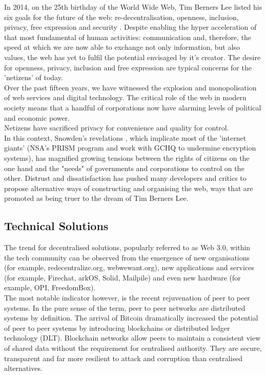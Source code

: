 In 2014, on the 25th birthday of the World Wide Web, Tim Berners Lee listed his six goals for the future of the web:  re-decentralisation, openness, inclusion, privacy, free expression and security \cite{berners_lee}.  Despite enabling the hyper acceleration of that most fundamental of human activities: communication and, therefore, the speed at which we are now able to exchange not only information, but also values, the web has yet to fulfil the potential envisaged by it's creator.  The desire for openness, privacy, inclusion and free expression are typical concerns for the 'netizens' of today. \\

Over the past fifteen years, we have witnessed the explosion and monopolisation of web services and digital technology. The critical role of the web in modern society means that a handful of corporations now have alarming levels of political and economic power. \\

Netizens have sacrificed privacy for convenience and quality for control.\\

In this context, Snowden's revelations \cite{Snowden}, which implicate most of the 'internet giants' \cite{nsa_giants} (NSA's PRISM \cite{Prism} program and work with GCHQ to undermine encryption systems\cite{nsa_undermine}), has magnified growing tensions between the rights of citizens on the one hand and the "needs" of governments and corporations to control on the other. Distrust and dissatisfaction has pushed many developers and critics to propose alternative ways of constructing and organising the web, ways that are promoted as being truer to the dream of Tim Berners Lee. 

\subsection{Technical Solutions}
The trend for decentralised solutions, popularly referred to as Web 3.0, within the tech community can be observed from the emergence of new organisations (for example, redecentralize.org\cite{Redecentralise}, webwewant.org\cite{Webwewant}), new applications and services (for example, Firechat\cite{Firechat}, arkOS\cite{Arkos}, Solid\cite{Solid}, Mailpile\cite{Mailpile}) and even new hardware (for example, OPI\cite{OPI}, FreedomBox\cite{Freedombox}).\\

The most notable indicator however, is the recent rejuvenation of peer to peer systems. In the pure sense of the term\cite{p2pdef}, peer to peer networks are distributed systems by definition. The arrival of Bitcoin\cite{nakamoto2008bitcoin} dramatically increased the potential of peer to peer systems by introducing blockchains or distributed ledger technology (DLT). Blockchain networks allow peers to maintain a consistent view of shared data without the requirement for centralised authority. They are secure, transparent and far more resilient to attack and corruption than centralised alternatives.\\ 

